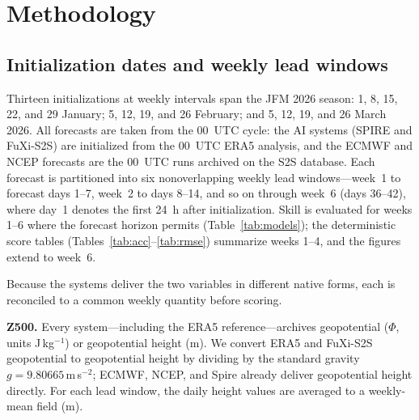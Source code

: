\documentclass[11pt]{article}
\begin{document}
\section{Methodology}\label{sec:method}

\subsection{Initialization dates and weekly lead windows}\label{sec:weeks}

Thirteen initializations at weekly intervals span the JFM 2026 season:
1, 8, 15, 22, and 29 January; 5, 12, 19, and 26 February; and 5, 12,
19, and 26 March 2026. All forecasts are taken from the 00~UTC cycle:
the AI systems (SPIRE and FuXi-S2S) are initialized from the 00~UTC ERA5
analysis, and the ECMWF and NCEP forecasts are the 00~UTC runs archived
on the S2S database. Each forecast is partitioned into six nonoverlapping
weekly lead windows---week~1 to forecast days 1--7, week~2 to days 8--14,
and so on through week~6 (days 36--42), where day~1 denotes the first
24~h after initialization. Skill is evaluated for weeks 1--6 where the
forecast horizon permits (Table~\ref{tab:models}); the deterministic
score tables (Tables~\ref{tab:acc}--\ref{tab:rmse}) summarize weeks 1--4,
and the figures extend to week~6.

Because the systems deliver the two variables in different native forms,
each is reconciled to a common weekly quantity before scoring.

\textbf{Z500.}
Every system---including the ERA5 reference---archives geopotential
($\Phi$, units J\,kg$^{-1}$) or geopotential height (m). We convert
ERA5 and FuXi-S2S geopotential to geopotential height by dividing by
the standard gravity $g = 9.80665$\,m\,s$^{-2}$; ECMWF, NCEP, and
Spire already deliver geopotential height directly. For each lead window,
the daily height values are averaged to a weekly-mean field (m).
\end{document}
